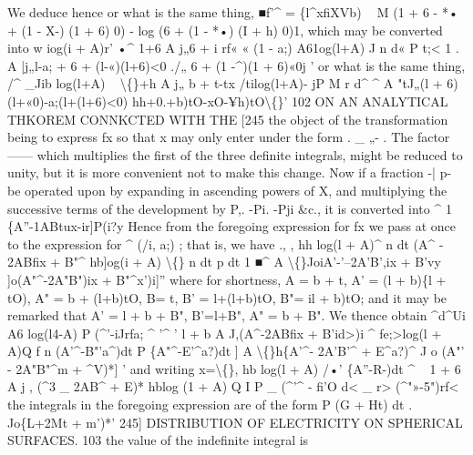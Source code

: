 \documentclass[11pt,a4paper]{book}
\begin{document}
We  deduce  hence
or  what  is  the  same  thing,
■f'^  =  \{l^xfiXVb)  ^^^^^^  M  (1  +  6  -  *•  +  (1  -  X-)  (1  +  6)  0)  -  log  (6  +  (1  -  *•)  (I  +  h)  0)1,
which    may  be   converted  into
w  iog(i  +  A)r'
•^       1+6         A         j„6  +  i
rf«
« (1  -  a;)
A61og(l+A)     J  n   d«
P  t;<  1
.
A  |j„l-a;  +  6  +  (l-«)(l+6)<0     ./„  6 +  (1 -^)(1  +  6)«0j  '
or   what   is   the   same   thing,
/^
_Jib    log(l+A)
~  \textbackslash\{\}+h         A         j„  b  +  t-tx
/tilog(l+A)- jP   M
r   d^  ^
A  "tJ„(l  +  6)(l+«0)-a;(l+(l+6)<0)     hh+0.+b)tO-xO-¥h)tO\textbackslash\{\}'
102  ON   AN   ANALYTICAL   THKOREM    CONNKCTED   WITH   THE  [245
the  object  of  the  transformation  being  to   express  fx  so  that  x  may  only  enter  under
the  form     .  _  „-  .    The  factor  ——    which  multiplies  the  first  of  the  three  definite
integrals,   might  be   reduced  to    unity,  but    it    is    more    convenient    not   to    make    this
change.
Now   if    a  fraction   -|  p-  be   operated   upon    by  expanding   in    ascending    powers
of  X,  and  multiplying  the  successive  terms  of  the  development  by  P,.  -Pi.  -Pji  \&c.,  it  is
converted  into  ^
1
\{A''-1ABtux-ir]P(i?y
Hence   from   the    foregoing   expression   for  fx   we    pass    at    once    to    the    expression    for
^  (/i,  a;) ;   that   is,   we   have
.,        ,  hh    log(l  +  A)^     n  dt
(A^  -  2ABfix  +  B"^
hb]og(i  +  A)    \textbackslash\{\}  n  dt
p      dt         1
■^  A  \textbackslash\{\}JoiA'-'--2A'B',ix  +  B'vy     ]o(A"^-2A"B")ix  +  B"^x')i]''
where  for  shortness,
A  =  b  +  t,     A'  =  (l  +  b)\{l  +  tO),    A"  =  b  +  (l+b)tO,
B=        t,     B'  =  l+(l+b)tO,       B"=        il  +  b)tO;
and   it   may   be   remarked  that
A'  =  l  +  b  +  B",    B'=l+B",    A"  =  b  +  B".
We   thence  obtain
^d^U^^)  A6    log(l4-A)  P        (^'-^^)^^
rfa;  ^  '^     '     l  +  b         A         J,(A^-2ABfix  +  B'id>)i
^
fe;>log(l  +  A)Q  f  n  (A'^-B"'a^)dt  P         \{A"^-E'^a?)dt         ]
A  \textbackslash\{\}h\{A'^-  2A'B'^  +  E^a?)^     J  o  (A"'  -  2A"B"^m  +  ^V)*]  '
and   writing  x=\textbackslash\{\},
hb    log(l  +  A)  /•'   \{A''-R-)dt
^  ~  1  +  6         A        j
,  (^3  _  2AB^  +  E)*
hblog (1  +  A)  Q  I
P  _ (^'^ - fi'O d<        _  r>
(^"»-5")rf<
the  integrals  in  the  foregoing  expression  are  of  the  form
P      (G  +  Ht)  dt      .
Jo\{L+2Mt  +  m')*'
245]  DISTRIBUTION   OF   ELECTRICITY   ON    SPHERICAL   SURFACES.  103
the  value  of  the  indefinite  integral  is
\end{document}
